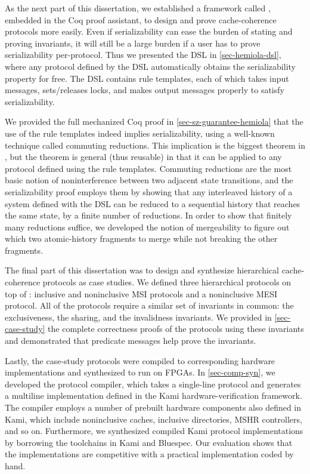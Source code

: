 As the next part of this dissertation, we established a framework called \hemiola{}, embedded in the Coq proof assistant, to design and prove cache-coherence protocols more easily.
Even if serializability can ease the burden of stating and proving invariants, it will still be a large burden if a user has to prove serializability per-protocol.
Thus we presented the \hemiola{} DSL in \autoref{sec-hemiola-dsl}, where any protocol defined by the DSL automatically obtains the serializability property for free.
The DSL contains rule templates, each of which takes input messages, sets/releases locks, and makes output messages properly to satisfy serializability.

We provided the full mechanized Coq proof in \autoref{sec-sz-guarantee-hemiola} that the use of the rule templates indeed implies serializability, using a well-known technique called commuting reductions.
This implication is the biggest theorem in \hemiola{}, but the theorem is general (thus reusable) in that it can be applied to any protocol defined using the rule templates.
Commuting reductions are the most basic notion of noninterference between two adjacent state transitions, and the serializability proof employs them by showing that any interleaved history of a system defined with the \hemiola{} DSL can be reduced to a sequential history that reaches the same state, by a finite number of reductions.
In order to show that finitely many reductions suffice, we developed the notion of mergeability to figure out which two atomic-history fragments to merge while not breaking the other fragments.

The final part of this dissertation was to design and synthesize hierarchical cache-coherence protocols as case studies.
We defined three hierarchical protocols on top of \hemiola{}: inclusive and noninclusive MSI protocols and a noninclusive MESI protocol.
All of the protocols require a similar set of invariants in common: the exclusiveness, the sharing, and the invalidness invariants.
We provided in \autoref{sec-case-study} the complete correctness proofs of the protocols using these invariants and demonstrated that predicate messages help prove the invariants.

Lastly, the case-study protocols were compiled to corresponding hardware implementations and synthesized to run on FPGAs.
In \autoref{sec-comp-syn}, we developed the protocol compiler, which takes a single-line \hemiola{} protocol and generates a multiline implementation defined in the Kami hardware-verification framework.
The compiler employs a number of prebuilt hardware components also defined in Kami, which include noninclusive caches, inclusive directories, MSHR controllers, and so on.
Furthermore, we synthesized compiled Kami protocol implementations by borrowing the toolchains in Kami and Bluespec.
Our evaluation shows that the implementations are competitive with a practical implementation coded by hand.

